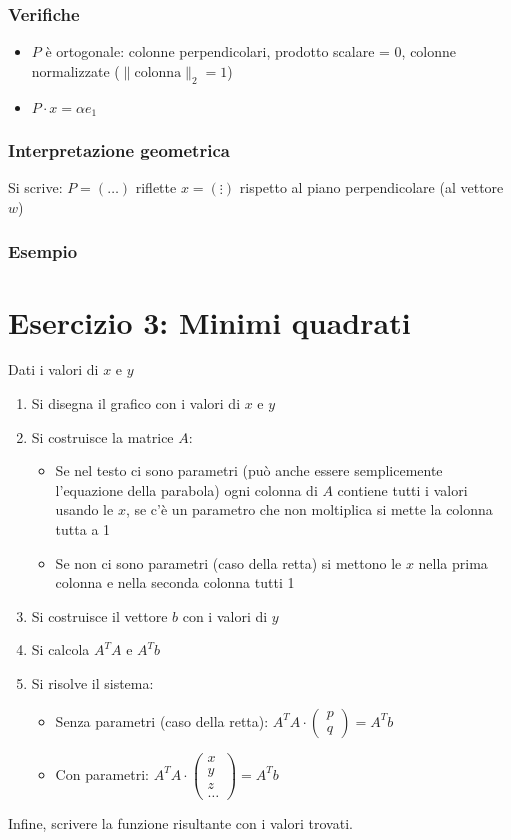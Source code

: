 \documentclass[10pt]{article}
\begin{document}
\subsubsection{Verifiche}
\begin{itemize}
    \item $P$ è ortogonale: colonne perpendicolari, prodotto scalare = 0, colonne normalizzate ($\lVert\text{colonna}\rVert_{2}=1$)
    \item $P\cdot x = \alpha e_{1}$
\end{itemize}
\subsubsection{Interpretazione geometrica}
Si scrive: $P=(\ldots)$ riflette $x=\left(\vdots\right)$ rispetto al piano perpendicolare (al vettore $w$)
\subsubsection*{Esempio}
\section*{Esercizio 3: Minimi quadrati}
Dati i valori di $x$ e $y$
\begin{enumerate}
    \item Si disegna il grafico con i valori di $x$ e $y$
    \item Si costruisce la matrice $A$: \begin{itemize}
        \item Se nel testo ci sono parametri (può anche essere semplicemente l'equazione della parabola) ogni colonna di $A$ contiene tutti i valori usando le $x$, se c'è un parametro che non moltiplica si mette la colonna tutta a 1
        \item Se non ci sono parametri (caso della retta) si mettono le $x$ nella prima colonna e nella seconda colonna tutti 1
    \end{itemize}
    \item Si costruisce il vettore $b$ con i valori di $y$
    \item Si calcola $A^{T}A$ e $A^{T}b$
    \item Si risolve il sistema: \begin{itemize}
        \item Senza parametri (caso della retta): $A^{T}A\cdot\begin{pmatrix}
            p \\ q
        \end{pmatrix} = A^{T}b$
        \item Con parametri: $A^{T}A\cdot\begin{pmatrix}
            x \\ y \\ z \\ \ldots
        \end{pmatrix} = A^{T}b$
    \end{itemize}
\end{enumerate}
Infine, scrivere la funzione risultante con i valori trovati.
\end{document}
